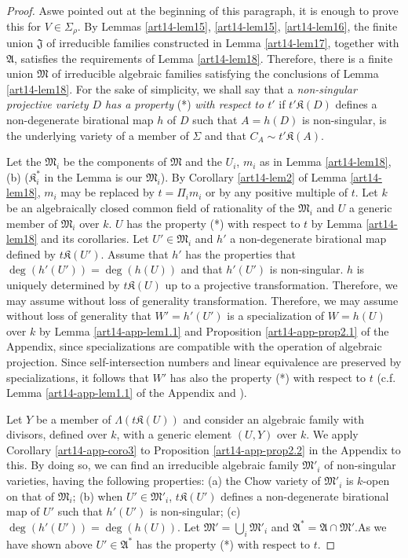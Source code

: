 \begin{proof}
As\pageoriginale we pointed out at the beginning of this paragraph, it is enough to prove this for $V\in \Sigma_{\rho}$. By Lemmas \ref{art14-lem15}, \ref{art14-lem15}, \ref{art14-lem16}, the finite union $\mathfrak{J}$ of irreducible families constructed in Lemma \ref{art14-lem17}, together with $\mathfrak{A}$, satisfies the requirements of Lemma \ref{art14-lem18}. Therefore, there is a finite union $\mathfrak{M}$ of irreducible algebraic families satisfying the conclusions of Lemma \ref{art14-lem18}. For the sake of simplicity, we shall say that a {\em non-singular projective variety $D$ has a property} (*) {\em with respect to $t'$} if $t'\mathfrak{K}(D)$ defines a non-degenerate birational map $h$ of $D$ such that $A=h(D)$ is non-singular, is the underlying variety of a member of $\Sigma$ and that $C_{A}\sim t'\mathfrak{K}(A)$.

Let the $\mathfrak{M}_{i}$ be the components of $\mathfrak{M}$ and the $U_{i}$, $m_{i}$ as in Lemma \ref{art14-lem18}, (b) ($\mathfrak{K}^{*}_{i}$ in the Lemma is our $\mathfrak{M}_{i}$). By Corollary \ref{art14-lem2} of Lemma \ref{art14-lem18}, $m_{i}$ may be replaced by $t=\Pi_{i}m_{i}$ or by any positive multiple of $t$. Let $k$ be an algebraically closed common field of rationality of the $\mathfrak{M}_{i}$ and $U$ a generic member of $\mathfrak{M}_{i}$ over $k$. $U$ has the property (*) with respect to $t$ by Lemma \ref{art14-lem18} and its corollaries. Let $U'\in \mathfrak{M}_{i}$ and $h'$ a non-degenerate birational map defined by $t\mathfrak{K}(U')$. Assume that $h'$ has the properties that $\deg(h'(U'))=\deg (h(U))$ and that $h'(U')$ is non-singular. $h$ is uniquely determined by $t\mathfrak{K}(U)$ up to a projective transformation. Therefore, we may assume without loss of generality transformation. Therefore, we may assume without loss of generality that $W'=h'(U')$ is a specialization of $W=h(U)$ over $k$ by Lemma \ref{art14-app-lem1.1} and Proposition \ref{art14-app-prop2.1} of the Appendix, since specializations are compatible with the operation of algebraic projection. Since self-intersection numbers and linear equivalence are preserved by specializations, it follows that $W'$ has also the property (*) with respect to $t$ (c.f. Lemma \ref{art14-app-lem1.1} of the Appendix and \cite{art14-key2}).

Let $Y$ be a member of $\Lambda(t\mathfrak{K}(U))$ and consider an algebraic family with divisors, defined over $k$, with a generic element $(U,Y)$ over $k$. We apply Corollary \ref{art14-app-coro3} to Proposition \ref{art14-app-prop2.2} in the Appendix to this. By doing so, we can find an irreducible algebraic family $\mathfrak{M}'_{i}$ of non-singular varieties, having the following properties: (a) the Chow variety of $\mathfrak{M}'_{i}$ is $k$-open on that of $\mathfrak{M}_{i}$; (b) when $U'\in \mathfrak{M}'_{i}$, $t\mathfrak{K}(U')$ defines a non-degenerate birational map of $U'$ such that $h'(U')$ is non-singular; (c) $\deg(h'(U'))=\deg (h(U))$. Let $\mathfrak{M}'=\bigcup_{i}\mathfrak{M}'_{i}$ and $\mathfrak{A}^{*}=\mathfrak{A}\cap \mathfrak{M}'$.\pageoriginale As we have shown above $U'\in \mathfrak{A}^{*}$ has the property (*) with respect to $t$.


\end{proof}
